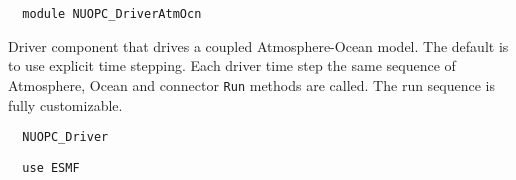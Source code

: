  
\setlength{\parskip}{0pt}
\setlength{\parindent}{0pt}
\setlength{\baselineskip}{11pt}
 
\def\bv{\begin{verbatim}}
\def\ev{\end{verbatim}}
\def\be{\begin{equation}}
\def\ee{\end{equation}}
\def\bea{\begin{eqnarray}}
\def\eea{\end{eqnarray}}
\def\bi{\begin{itemize}}
\def\ei{\end{itemize}}
\def\bn{\begin{enumerate}}
\def\en{\end{enumerate}}
\def\bd{\begin{description}}
\def\ed{\end{description}}
\def\({\left (}
\def\){\right )}
\def\[{\left [}
\def\]{\right ]}
\def\<{\left  \langle}
\def\>{\right \rangle}
\def\cI{{\cal I}}
\def\diag{\mathop{\rm diag}}
\def\tr{\mathop{\rm tr}}


\begin{verbatim}  module NUOPC_DriverAtmOcn
\end{verbatim}

Driver component that drives a coupled Atmosphere-Ocean model. The default is to use explicit time stepping. Each driver time step the same sequence of Atmosphere, Ocean and connector {\tt Run} methods are called. The run sequence is fully customizable.

\begin{verbatim}  NUOPC_Driver
\end{verbatim}

\begin{verbatim}  use ESMF
\end{verbatim}

